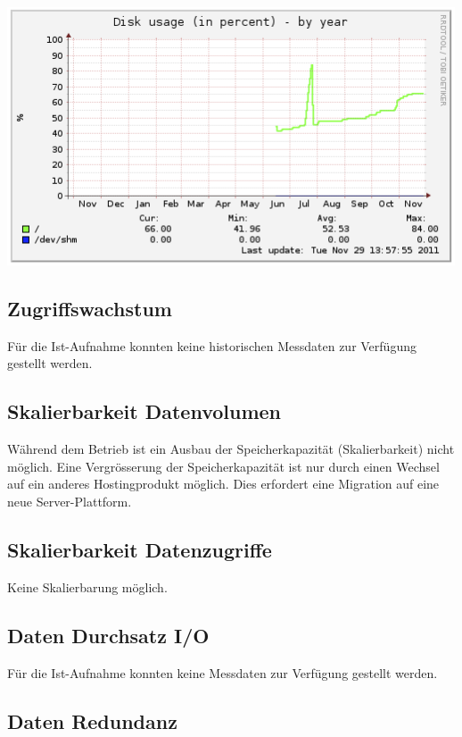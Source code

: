 \begin{center}
\includegraphics[width=\linewidth, keepaspectratio = true]{media/disk-usage-by-year.png}
\end{center}

\subsection{Zugriffswachstum}
Für die Ist-Aufnahme konnten keine historischen Messdaten zur Verfügung gestellt werden.

\subsection{Skalierbarkeit Datenvolumen}
Während dem Betrieb ist ein Ausbau der Speicherkapazität (Skalierbarkeit) nicht möglich. Eine Vergrösserung der Speicherkapazität ist nur durch einen Wechsel auf ein anderes Hostingprodukt möglich. Dies erfordert eine Migration auf eine neue Server-Plattform. 

\subsection{Skalierbarkeit Datenzugriffe}
Keine Skalierbarung möglich. 

\subsection{Daten Durchsatz I/O}
Für die Ist-Aufnahme konnten keine Messdaten zur Verfügung gestellt werden.

\subsection{Daten Redundanz}


